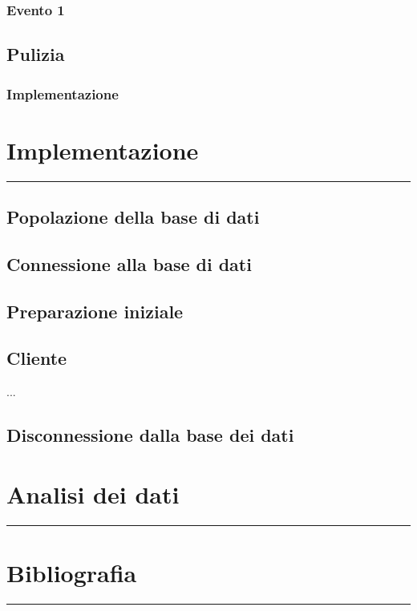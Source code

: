 \documentclass[a4paper]{article}
\begin{document}
\subsubsection{Evento 1}
\subsection{Pulizia}
\subsubsection{Implementazione}
\newpage

\section{Implementazione}
\rule{\linewidth}{1.5pt}
\subsection{Popolazione della base di dati}
\subsection{Connessione alla base di dati}
\subsection{Preparazione iniziale}
\subsection{Cliente}

...

\subsection{Disconnessione dalla base dei dati}
\newpage
\section{Analisi dei dati}
\rule{\linewidth}{1.5pt}

\newpage

\section{Bibliografia}
\rule{\linewidth}{1.5pt}
\end{document}
